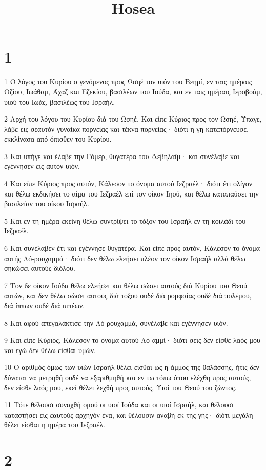 

\title{Hosea}


\chapter{1}

\par 1 Ο λόγος του Κυρίου ο γενόμενος προς Ωσηέ τον υιόν του Βεηρί, εν ταις ημέραις Οζίου, Ιωάθαμ, Άχαζ και Εζεκίου, βασιλέων του Ιούδα, και εν ταις ημέραις Ιεροβοάμ, υιού του Ιωάς, βασιλέως του Ισραήλ.
\par 2 Αρχή του λόγου του Κυρίου διά του Ωσηέ. Και είπε Κύριος προς τον Ωσηέ, Ύπαγε, λάβε εις σεαυτόν γυναίκα πορνείας και τέκνα πορνείας· διότι η γη κατεπόρνευσε, εκκλίνασα από όπισθεν του Κυρίου.
\par 3 Και υπήγε και έλαβε την Γόμερ, θυγατέρα του Δεβηλαΐμ· και συνέλαβε και εγέννησεν εις αυτόν υιόν.
\par 4 Και είπε Κύριος προς αυτόν, Κάλεσον το όνομα αυτού Ιεζραέλ· διότι έτι ολίγον και θέλω εκδικήσει το αίμα του Ιεζραέλ επί τον οίκον Ιηού, και θέλω καταπαύσει την βασιλείαν του οίκου Ισραήλ.
\par 5 Και εν τη ημέρα εκείνη θέλω συντρίψει το τόξον του Ισραήλ εν τη κοιλάδι του Ιεζραέλ.
\par 6 Και συνέλαβεν έτι και εγέννησε θυγατέρα. Και είπε προς αυτόν, Κάλεσον το όνομα αυτής Λό-ρουχαμμά· διότι δεν θέλω ελεήσει πλέον τον οίκον Ισραήλ αλλά θέλω σηκώσει αυτούς διόλου.
\par 7 Τον δε οίκον Ιούδα θέλω ελεήσει και θέλω σώσει αυτούς διά Κυρίου του Θεού αυτών, και δεν θέλω σώσει αυτούς διά τόξου ουδέ διά ρομφαίας ουδέ διά πολέμου, διά ίππων ουδέ διά ιππέων.
\par 8 Και αφού απεγαλάκτισε την Λό-ρουχαμμά, συνέλαβε και εγέννησεν υιόν.
\par 9 Και είπε Κύριος, Κάλεσον το όνομα αυτού Λό-αμμί· διότι σεις δεν είσθε λαός μου και εγώ δεν θέλω είσθαι υμών.
\par 10 Ο αριθμός όμως των υιών Ισραήλ θέλει είσθαι ως η άμμος της θαλάσσης, ήτις δεν δύναται να μετρηθή ουδέ να εξαριθμηθή και εν τω τόπω όπου ελέχθη προς αυτούς, δεν είσθε λαός μου, εκεί θέλει λεχθή προς αυτούς, Υιοί του Θεού του ζώντος.
\par 11 Τότε θέλουσι συναχθή ομού οι υιοί Ιούδα και οι υιοί Ισραήλ, και θέλουσι καταστήσει εις εαυτούς αρχηγόν ένα, και θέλουσιν αναβή εκ της γής· διότι μεγάλη θέλει είσθαι η ημέρα του Ιεζραέλ.

\chapter{2}

